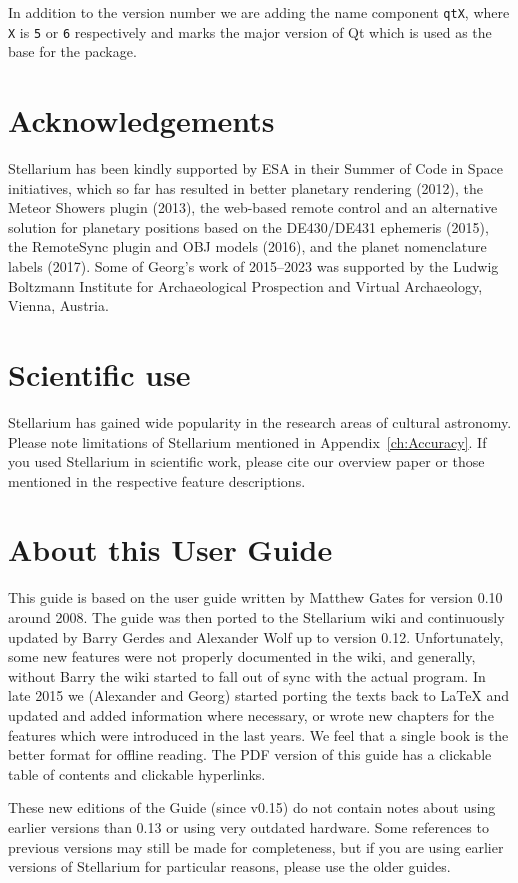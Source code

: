 In addition to the version number we are adding the name component \texttt{qtX}, 
where \texttt{X} is \texttt{5} or \texttt{6} respectively and marks the 
major version of Qt which is used as the base for the package.

\section{Acknowledgements}
Stellarium has been kindly supported by ESA in their Summer of Code in
Space initiatives, which so far has resulted in better planetary rendering
(2012), the Meteor Showers plugin (2013), the web-based remote
control and an alternative solution for planetary positions based on
the DE430/DE431 ephemeris (2015), the RemoteSync plugin and OBJ models (2016), 
and the planet nomenclature labels (2017). Some of Georg's work of 2015--2023 was
supported by the Ludwig Boltzmann Institute for Archaeological
Prospection and Virtual Archaeology, Vienna, Austria.

\section{Scientific use}

Stellarium has gained wide popularity in the research areas of
cultural astronomy. Please note limitations of Stellarium mentioned in
Appendix~\ref{ch:Accuracy}. If you used Stellarium in scientific work,
please cite our overview paper \citep{Zotti-etal:JSA2020.6.2} or those
mentioned in the respective feature descriptions.

\section{About this User Guide}
This guide is based on the user guide written by Matthew Gates for
version 0.10 around 2008. The guide was then ported to the Stellarium
wiki and continuously updated by Barry Gerdes and Alexander Wolf up to version 0.12. 
Unfortunately, some new features were not properly documented in the wiki, and generally, 
without Barry the wiki started to fall out of sync with
the actual program.  In late 2015 we (Alexander and Georg) started porting the texts
back to \LaTeX{} and updated and added information where necessary, 
or wrote new chapters for the features which were introduced in the last years. 
We feel that a single book is the better format for offline
reading. The PDF version of this guide has a clickable table of
contents and clickable hyperlinks.

These new editions of the Guide (since v0.15) do not contain notes about using
earlier versions than 0.13 or using very outdated hardware.
Some references to previous versions may still be made for completeness, 
but if you are using earlier versions of Stellarium 
for particular reasons, please use the older guides.


